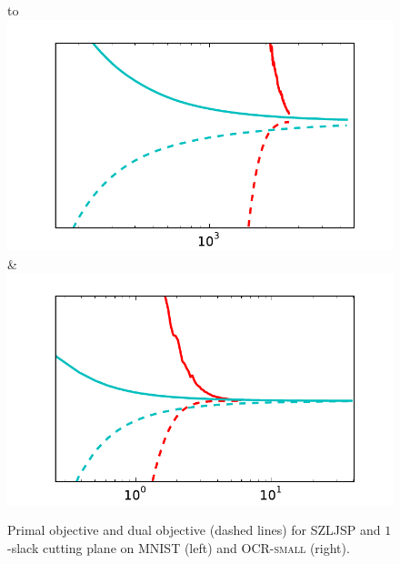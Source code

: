 \begin{figure}
    \begin{tabu} to 
    \\[-3mm]
    \includegraphics[width=\linewidth]{evaluation/images/mnist_duality_gap}&%
    \includegraphics[width=\linewidth]{evaluation/images/letters_small_duality_gap}
    \end{tabu}
\caption{%
    Primal objective and dual objective (dashed lines) for SZLJSP and $1$-slack cutting plane on MNIST (left) and \textsc{OCR-small} (right).
}
\end{figure}


